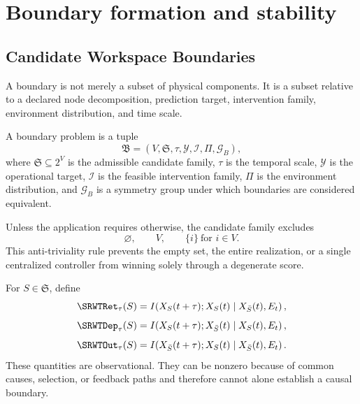 
\chapter{Boundary formation and stability}\label{SRWT:book:chapter-81}


\section{Candidate Workspace Boundaries}

A boundary is not merely a subset of physical components. It is a subset
relative to a declared node decomposition, prediction target, intervention
family, environment distribution, and time scale.

\begin{SRWTdefinition}\label{SRWT:def:boundary-problem}
A boundary problem is a tuple
\[
\mathfrak B
=
\left(
V,
\mathfrak S,
\tau,
\mathcal Y,
\mathcal I,
\Pi,
\mathcal G_B
\right),
\]
where \(\mathfrak S\subseteq2^V\) is the admissible candidate family,
\(\tau\) is the temporal scale, \(\mathcal Y\) is the operational target,
\(\mathcal I\) is the feasible intervention family, \(\Pi\) is the
environment distribution, and \(\mathcal G_B\) is a symmetry group under
which boundaries are considered equivalent.
\end{SRWTdefinition}

Unless the application requires otherwise, the candidate family excludes
\[
\varnothing,
\qquad
V,
\qquad
\{i\}\ \text{for }i\in V.
\]
This anti-triviality rule prevents the empty set, the entire realization, or a
single centralized controller from winning solely through a degenerate score.


For \(S\in\mathfrak S\), define
\[
\SRWTRet_\tau(S)
=
I\!\left(
X_S(t+\tau);X_S(t)
\mid X_{\bar S}(t),E_t
\right),
\]
\[
\SRWTDep_\tau(S)
=
I\!\left(
X_S(t+\tau);X_{\bar S}(t)
\mid X_S(t),E_t
\right),
\]
\[
\SRWTOut_\tau(S)
=
I\!\left(
X_{\bar S}(t+\tau);X_S(t)
\mid X_{\bar S}(t),E_t
\right).
\]
These quantities are observational. They can be nonzero because of common
causes, selection, or feedback paths and therefore cannot alone establish a
causal boundary.


